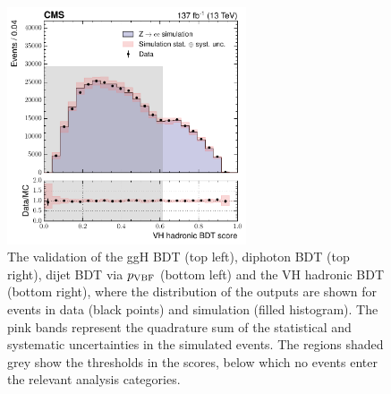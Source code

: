 \begin{figure}[htbp]
  \hfill
  \includegraphics[height=7cm]{Figures/hgg_overview/DYValidation_VHBDT_VH_had_mvascore_ratioPlot.pdf}
  \caption[Validation of the event categorisation classifiers]
  {
    The validation of the ggH BDT (top left), diphoton BDT (top right), dijet BDT via $p_{\rm{VBF}}$ (bottom left) and the VH hadronic BDT (bottom right), where the distribution of the outputs are shown for \Zee events in data (black points) and simulation (filled histogram). The pink bands represent the quadrature sum of the statistical and systematic uncertainties in the simulated events. The regions shaded grey show the thresholds in the scores, below which no events enter the relevant analysis categories.
  }
  \label{fig:categorisation_validation}
\end{figure}


